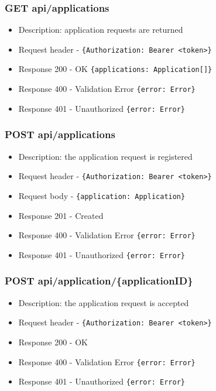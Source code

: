 \subsubsection{GET api/applications}
\begin{itemize}
    \item Description: application requests are returned
    \item Request header - \verb|{Authorization: Bearer <token>}|
    \item Response 200 - OK \verb|{applications: Application[]}|
    \item Response 400 - Validation Error \verb|{error: Error}|
    \item Response 401 - Unauthorized \verb|{error: Error}|
\end{itemize}

\subsubsection{POST api/applications}
\begin{itemize}
    \item Description: the application request is registered
    \item Request header - \verb|{Authorization: Bearer <token>}|
    \item Request body - \verb|{application: Application}|
    \item Response 201 - Created
    \item Response 400 - Validation Error \verb|{error: Error}|
    \item Response 401 - Unauthorized \verb|{error: Error}|
\end{itemize}

\subsubsection{POST api/application/\{applicationID\}}
\begin{itemize}
    \item Description: the application request is accepted
    \item Request header - \verb|{Authorization: Bearer <token>}|
    \item Response 200 - OK
    \item Response 400 - Validation Error \verb|{error: Error}|
    \item Response 401 - Unauthorized \verb|{error: Error}|
\end{itemize}

